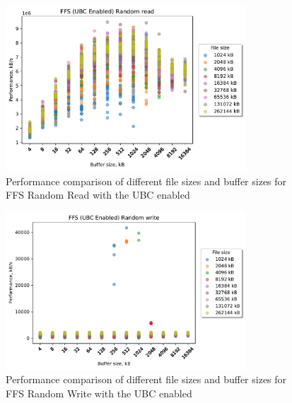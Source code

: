 \begin{figure}[!htb]
	\label{fig:bench_ffs_no_ubc_scatter_rnd_read}
	\begin{center}
		\includegraphics[width=0.8\textwidth]{figures.nosync/benchmarking/FFS/scatter-UBC Enabled-Random read.pdf}
	\end{center}
	\caption[Comparison of Random Read performance for file size and buffer size for FFS with the UBC disabled]{Performance comparison of different file sizes and buffer sizes for FFS Random Read with the UBC enabled}
\end{figure}
\begin{figure}[!htb]
	\label{fig:bench_ffs_no_ubc_scatter_rnd_write}
	\begin{center}
		\includegraphics[width=0.8\textwidth]{figures.nosync/benchmarking/FFS/scatter-UBC Enabled-Random write.pdf}
	\end{center}
	\caption[Comparison of Random Write performance for file size and buffer size for FFS with the UBC disabled]{Performance comparison of different file sizes and buffer sizes for FFS Random Write with the UBC enabled}
\end{figure}
\clearpage



